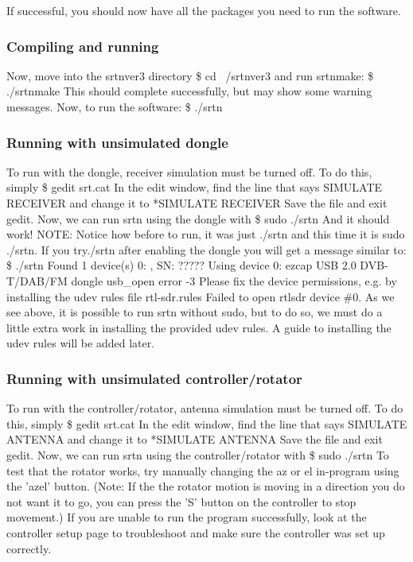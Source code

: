 \documentclass[11pt]{article} %
\begin{document}
If successful, you should now have all the packages you need to run the software.

\subsubsection{Compiling and running}

Now, move into the srtnver3 directory
\$ cd ~/srtnver3
and run srtnmake:
\$ ./srtnmake
This should complete successfully, but may show some warning messages. Now, to run the software:
\$ ./srtn

\subsubsection{Running with unsimulated dongle}
To run with the dongle, receiver simulation must be turned off. To do this, simply
\$ gedit srt.cat
In the edit window, find the line that says
SIMULATE RECEIVER
and change it to
*SIMULATE RECEIVER
Save the file and exit gedit. Now, we can run srtn using the dongle with
\$ sudo ./srtn
And it should work!
NOTE: Notice how before to run, it was just ./srtn and this time it is sudo ./srtn. If you try./srtn after enabling the dongle you will get a message similar to:
\$ ./srtn
Found 1 device(s)
  0:  ,   SN:  ?????
Using device 0: ezcap USB 2.0 DVB-T/DAB/FM dongle
usb\_open error -3
Please fix the device permissions, e.g. by installing the udev rules file rtl-sdr.rules
Failed to open rtlsdr device \#0.
As we see above, it is possible to run srtn without sudo, but to do so, we must do a little extra work in installing the provided udev rules. A guide to installing the udev rules will be added later.

\subsubsection{Running with unsimulated controller/rotator}
To run with the controller/rotator, antenna simulation must be turned off. To do this, simply
\$ gedit srt.cat
In the edit window, find the line that says
SIMULATE ANTENNA
and change it to
*SIMULATE ANTENNA
Save the file and exit gedit. Now, we can run srtn using the controller/rotator with
\$ sudo ./srtn
To test that the rotator works, try manually changing the az or el in-program using the 'azel' button. (Note: If the the rotator motion is moving in a direction you do not want it to go, you can press the 'S' button on the controller to stop movement.)
If you are unable to run the program successfully, look at the controller setup page to troubleshoot and make sure the controller was set up correctly.
\end{document}
